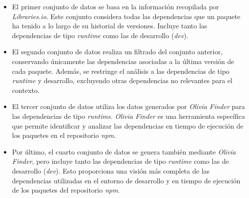 \begin{itemize}
    \item El primer conjunto de datos se basa en la información recopilada por
          \textit{Libraries.io}. Este conjunto considera todas las dependencias que un paquete ha
          tenido a lo largo de su historial de versiones. Incluye tanto las dependencias de tipo
          \textit{runtime} como las de desarrollo (\textit{dev}).
    \item El segundo conjunto de datos realiza un filtrado del conjunto anterior, conservando
          únicamente las dependencias asociadas a la última versión de cada paquete. Además, se
          restringe el análisis a las dependencias de tipo \textit{runtime} y desarrollo, excluyendo
          otras dependencias no relevantes para el contexto.

    \item El tercer conjunto de datos utiliza los datos generados por \textit{Olivia Finder}
          para las dependencias de tipo \textit{runtime}. \textit{Olivia Finder} es una herramienta
          específica que permite identificar y analizar las dependencias en tiempo de ejecución de
          los paquetes en el repositorio \textit{npm}.

    \item Por último, el cuarto conjunto de datos se genera también mediante \textit{Olivia Finder},
          pero incluye tanto las dependencias de tipo \textit{runtime} como las de desarrollo
          (\textit{dev}). Esto proporciona una visión más completa de las dependencias utilizadas en
          el entorno de desarrollo y en tiempo de ejecución de los paquetes del repositorio \textit{npm}.
\end{itemize}

